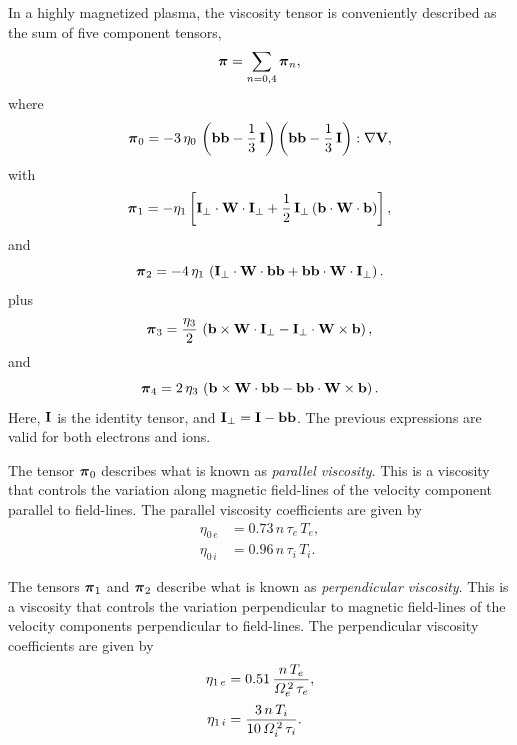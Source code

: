 \documentclass[notitlepage,12pt]{article}
\newcommand{\bpi}{\mbox{\boldmath$\pi$}}
\begin{document}
In a highly magnetized plasma, the viscosity tensor is conveniently  described as the
sum of  five component tensors,
\begin{equation}
\bpi  = \sum_{n=0,4} \bpi_n,
\end{equation}
where 
\begin{equation}
\bpi_0 = - 3\,\eta_0\,\left({\bf b}{\bf b} - \frac{1}{3}\,{\bf I}\right)
\left({\bf b}{\bf b} - \frac{1}{3}\,{\bf I}\right): \nabla {\bf V},
\end{equation}
with
\begin{equation}
\bpi_1 =- \eta_1\left[{\bf I}_\perp \cdot{\bf W}\cdot{\bf I}_\perp
+ \frac{1}{2}\,{\bf I}_\perp\,({\bf b}\cdot{\bf W}\cdot{\bf b})\right],
\end{equation}
and
\begin{equation}
\bpi_2 = -4\,\eta_1\,\left({\bf I}_\perp\cdot
{\bf W}\cdot{\bf b}{\bf b}
+ {\bf b}{\bf b}\cdot{\bf W} \cdot{\bf I}_\perp\right).
\end{equation}
plus
\begin{equation}
\bpi_3 = \frac{\eta_3}{2}\,\left( {\bf b}\times 
{\bf W}\cdot{\bf I}_\perp - {\bf I}_\perp\cdot{\bf W}\times{\bf b}
\right),
\end{equation}
and
\begin{equation}
\bpi_4 = 2\,\eta_3\,\left({\bf b} \times{\bf W} \cdot {\bf b}{\bf b}
- {\bf b}{\bf b} \cdot{\bf W} \times{\bf b}\right).
\end{equation}
Here, ${\bf I}$ is the identity tensor, and 
${\bf I}_\perp = {\bf I} - {\bf b}{\bf b}$. The previous 
expressions are valid for both electrons and ions. 

The tensor $\bpi_0$ describes what is known as {\em parallel viscosity}.
This is a viscosity that controls the variation along magnetic field-lines of the
velocity component parallel to  field-lines.
 The parallel
viscosity coefficients are given by 
\begin{align}\label{e3.89a}
\eta_{0\,e} &= 0.73\,n\,\tau_e\,T_e,\\[0.5ex]
\eta_{0\,i} &= 0.96\,n\,\tau_i\,T_i.\label{e3.89b}
\end{align}

The tensors $\bpi_1$ and $\bpi_2$ describe what is known
as {\em perpendicular viscosity}. This is a viscosity
that controls the variation perpendicular to magnetic field-lines
of the velocity components perpendicular to field-lines. The perpendicular
viscosity coefficients are given by
\begin{align}
\eta_{1\,e} &= 0.51\, \frac{n\,T_e}{{\mit\Omega}_e^{\,2}\,\tau_e},\\[0.5ex]
\eta_{1\,i} &= \frac{3\, n\,T_i}{10\,{\mit\Omega}_i^{\,2}\,\tau_i}.
\end{align}
\end{document}
